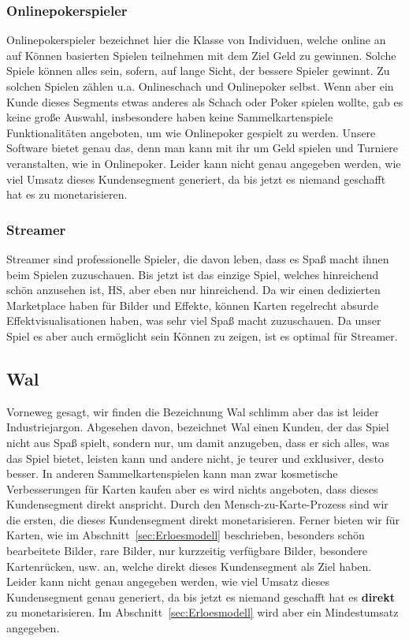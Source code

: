 \documentclass[fontsize=11, a4aper]{scrartcl}
\begin{document}
\subsubsection{Onlinepokerspieler} \label{subsubsec:Professioneller_Spieler_Onlinepokerspieler}

Onlinepokerspieler bezeichnet hier die Klasse von Individuen, welche online an auf Können basierten Spielen teilnehmen mit dem Ziel Geld zu gewinnen. Solche Spiele können alles sein, sofern, auf lange Sicht, der bessere Spieler gewinnt. Zu solchen Spielen zählen u.a. Onlineschach und Onlinepoker selbst. Wenn aber ein Kunde dieses Segments etwas anderes als Schach oder Poker spielen wollte, gab es keine große Auswahl, insbesondere haben keine Sammelkartenspiele Funktionalitäten angeboten, um wie Onlinepoker gespielt zu werden. Unsere Software bietet genau das, denn man kann mit ihr um Geld spielen und Turniere veranstalten, wie in Onlinepoker. Leider kann nicht genau angegeben werden, wie viel Umsatz dieses Kundensegment generiert, da bis jetzt es niemand geschafft hat es zu monetarisieren.

\subsubsection{Streamer} \label{subsubsec:Professioneller Spieler_Streamer}

Streamer sind professionelle Spieler, die davon leben, dass es Spaß macht ihnen beim Spielen zuzuschauen. Bis jetzt ist das einzige Spiel, welches hinreichend schön anzusehen ist, \acl{HS}, aber eben nur hinreichend. Da wir einen dedizierten Marketplace haben für Bilder und Effekte, können Karten regelrecht absurde Effektvisualisationen haben, was sehr viel Spaß macht zuzuschauen. Da unser Spiel es aber auch ermöglicht sein Können zu zeigen, ist es optimal für Streamer.

\subsection{Wal} \label{subsec:Wal}

Vorneweg gesagt, wir finden die Bezeichnung \glqq Wal\grqq{} schlimm aber das ist leider Industriejargon. Abgesehen davon, bezeichnet \glqq Wal\grqq{} einen Kunden, der das Spiel nicht aus Spaß spielt, sondern nur, um damit anzugeben, dass er sich alles, was das Spiel bietet, leisten kann und andere nicht, je teurer und exklusiver, desto besser. In anderen Sammelkartenspielen kann man zwar kosmetische Verbesserungen für Karten kaufen aber es wird nichts angeboten, dass dieses Kundensegment direkt anspricht. Durch den \glqq Mensch-zu-Karte-Prozess\grqq{} sind wir die ersten, die dieses Kundensegment direkt monetarisieren. Ferner bieten wir für Karten, wie im Abschnitt~\ref{sec:Erloesmodell} beschrieben, besonders schön bearbeitete Bilder, rare Bilder, nur kurzzeitig verfügbare Bilder, besondere Kartenrücken, usw. an, welche direkt dieses Kundensegment als Ziel haben. Leider kann nicht genau angegeben werden, wie viel Umsatz dieses Kundensegment genau generiert, da bis jetzt es niemand geschafft hat es \textbf{direkt} zu monetarisieren. Im Abschnitt~\ref{sec:Erloesmodell} wird aber ein Mindestumsatz angegeben.
\end{document}
